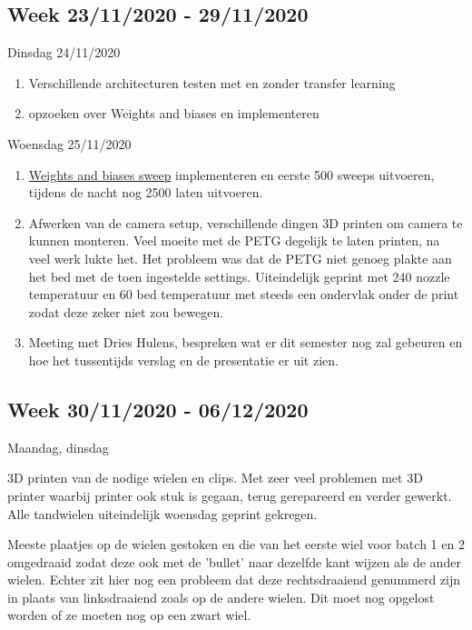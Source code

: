 \documentclass{article}
\begin{document}
\subsection{Week 23/11/2020 - 29/11/2020}

Dinsdag 24/11/2020

\begin{enumerate}[1]
\item Verschillende architecturen testen met en zonder transfer learning
\item opzoeken over Weights and biases en implementeren
\end{enumerate}


Woensdag 25/11/2020

\begin{enumerate}[1]
\item \href{https://wandb.ai/dplars/pytorch-twi_second_handmade_sweep?workspace=user-dplars}{Weights and biases sweep} implementeren en eerste 500 sweeps uitvoeren, tijdens de nacht nog 2500 laten uitvoeren.
\item Afwerken van de camera setup, verschillende dingen 3D printen om camera te kunnen monteren. Veel moeite met de PETG degelijk te laten printen, na veel werk lukte het. Het probleem was dat de PETG niet genoeg plakte aan het bed met de toen ingestelde settings. Uiteindelijk geprint met 240 nozzle temperatuur en 60 bed temperatuur met steeds een ondervlak onder de print zodat deze zeker niet zou bewegen.
\item Meeting met Dries Hulens, bespreken wat er dit semester nog zal gebeuren en hoe het tussentijds verslag en de presentatie er uit zien. 
\end{enumerate}


\subsection{Week 30/11/2020 - 06/12/2020}

Maandag, dinsdag

3D printen van de nodige wielen en clips. Met zeer veel problemen met 3D printer waarbij printer ook stuk is gegaan, terug gerepareerd en verder gewerkt. Alle tandwielen uiteindelijk woensdag geprint gekregen. 

Meeste plaatjes op de wielen gestoken en die van het eerste wiel voor batch 1 en 2 omgedraaid zodat deze ook met de 'bullet' naar dezelfde kant wijzen als de ander wielen. Echter zit hier nog een probleem dat deze rechtsdraaiend genummerd zijn in plaats van linksdraaiend zoals op de andere wielen. Dit moet nog opgelost worden of ze moeten nog op een zwart wiel.
\end{document}
